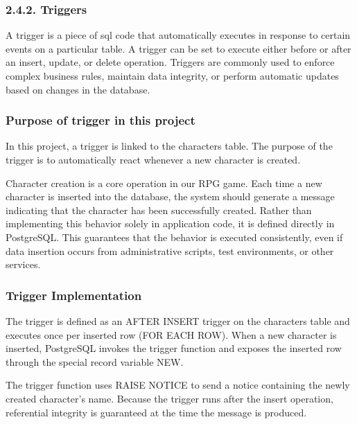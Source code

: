 \hypertarget{triggers}{%
\subsubsection{2.4.2. Triggers}\label{triggers}}

A trigger is a piece of sql code that automatically executes in response
to certain events on a particular table. A trigger can be set to execute
either before or after an insert, update, or delete operation. Triggers
are commonly used to enforce complex business rules, maintain data
integrity, or perform automatic updates based on changes in the
database.

\hypertarget{purpose-of-trigger-in-this-project}{%
\subsubsection{Purpose of trigger in this
project}\label{purpose-of-trigger-in-this-project}}

In this project, a trigger is linked to the characters table. The
purpose of the trigger is to automatically react whenever a new
character is created.

Character creation is a core operation in our RPG game. Each time a new
character is inserted into the database, the system should generate a
message indicating that the character has been successfully created.
Rather than implementing this behavior solely in application code, it is
defined directly in PostgreSQL. This guarantees that the behavior is
executed consistently, even if data insertion occurs from administrative
scripts, test environments, or other services.

\hypertarget{trigger-implementation}{%
\subsubsection{Trigger Implementation}\label{trigger-implementation}}

The trigger is defined as an AFTER INSERT trigger on the characters
table and executes once per inserted row (FOR EACH ROW). When a new
character is inserted, PostgreSQL invokes the trigger function and
exposes the inserted row through the special record variable NEW.

The trigger function uses RAISE NOTICE to send a notice containing the
newly created character's name. Because the trigger runs after the
insert operation, referential integrity is guaranteed at the time the
message is produced.


